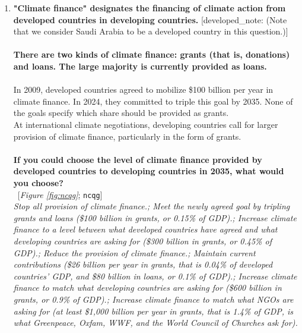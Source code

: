 \begin{enumerate}[resume]
\item  \label{q:ncqg} \textbf{"Climate finance" designates the financing of climate action from developed countries in developing countries.} [developed\_note: (Note that we consider Saudi Arabia to be a developed country in this question.)]\\\\\textbf{There are two kinds of climate finance: grants (that is, donations) and loans. The large majority is currently provided as loans.~}\\\\In 2009, developed countries agreed to mobilize \$100 billion per year in climate finance. In 2024, they committed to triple this goal by 2035. None of the goals specify which share should be provided as grants.~\\At international climate negotiations, developing countries call for larger provision of climate finance, particularly in the form of grants.\\\\\textbf{If you could choose the level of climate finance provided by developed countries to developing countries in 2035, what would you choose?}\\ 
~[\textit{Figure \ref{fig:ncqg}}; 
\verb|ncqg|]
  \\ \textit{Stop all provision of climate finance.; Meet the newly agreed goal by tripling grants and loans (\$100 billion in grants, or 0.15\% of GDP).; Increase climate finance to a level between what developed countries have agreed and what developing countries are asking for (\$300 billion in grants, or 0.45\% of GDP).; Reduce the provision of climate finance.; Maintain current contributions (\$26 billion per year in grants, that is 0.04\% of developed countries' GDP, and \$80 billion in loans, or 0.1\% of GDP).; Increase climate finance to match what developing countries are asking for (\$600 billion in grants, or 0.9\% of GDP).; Increase climate finance to match what NGOs are asking for (at least \$1,000 billion per year in grants, that is 1.4\% of GDP, is what Greenpeace, Oxfam, WWF, and the World Council of Churches ask for).}

\end{enumerate} 

